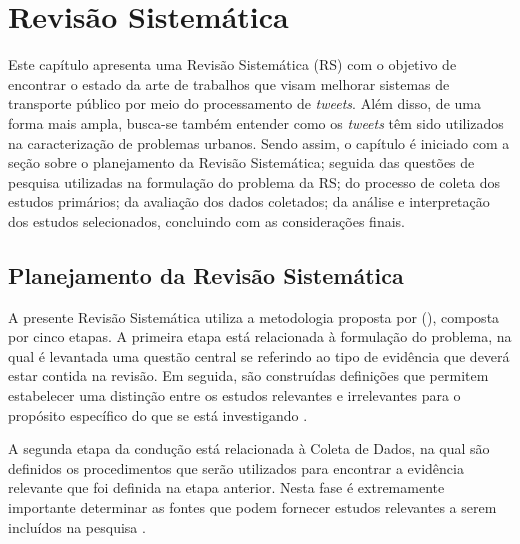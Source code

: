 \documentclass[
	12pt,				%
	oneside,			%
	a4paper,			%
	english,			%
	brazil				%
	]{abntex2ppgsi}
\begin{document}
\chapter{Revisão Sistemática}
\label{revisao}
Este capítulo apresenta uma Revisão Sistemática (RS) com o objetivo de encontrar o estado da arte de trabalhos que visam melhorar sistemas de transporte público por meio do processamento de \textit{tweets}. Além disso, de uma forma mais ampla, busca-se também entender como os \textit{tweets} têm sido utilizados na caracterização de problemas urbanos. Sendo assim, o capítulo é iniciado com a seção sobre o planejamento da Revisão Sistemática; seguida das questões de pesquisa utilizadas na formulação do problema da RS; do processo de coleta dos estudos primários; da avaliação dos dados coletados; da análise e interpretação dos estudos selecionados, concluindo com as considerações finais.



\section{Planejamento da Revisão Sistemática}
\label{planejamento}
A presente Revisão Sistemática utiliza a metodologia proposta por \citeauthor{biolchini2005techincal} (\citeyear{biolchini2005techincal}), composta por cinco etapas.
A primeira etapa está relacionada à formulação do problema, na qual é levantada uma questão central se referindo ao tipo de evidência que deverá  estar contida na revisão. Em seguida, são construídas definições que permitem estabelecer uma distinção entre os estudos relevantes e irrelevantes para o propósito específico do que se está investigando \cite{biolchini2005techincal}.

A segunda etapa da condução está relacionada à Coleta de Dados, na qual são definidos os procedimentos que serão utilizados para encontrar a evidência relevante que foi definida na etapa anterior. Nesta fase é extremamente importante determinar as fontes que podem fornecer estudos relevantes a serem incluídos na pesquisa \cite{biolchini2005techincal}.
\end{document}
